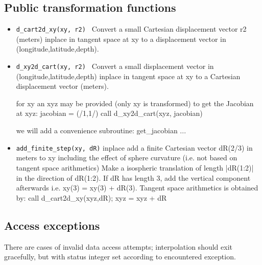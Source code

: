 


\subsection{Public transformation functions}

\begin{itemize}

    \item {\tt d\_cart2d\_xy(xy, r2) } Convert a small Cartesian displacement vector r2 (meters)
           inplace in tangent space at xy to a displacement vector in (longitude,latitude,depth).

    \item {\tt d\_xy2d\_cart(xy, r2) } Convert a small displacement vector in (longitude,latitude,depth)
           inplace in tangent space at xy to a Cartesian displacement vector (meters).


      
for xy an xyz may be provided (only xy is transformed)
to get the Jacobian at xyz: \newline
jacobian = (/1,1/) \newline
call d\_xy2d\_cart(xyz, jacobian)\newline

we will add a convenience subroutine: get\_jacobian ...

    \item {\tt add\_finite\_step(xy, dR)} inplace add a finite
           Cartesian vector dR(2/3) in meters to xy including the 
           effect of sphere curvature (i.e. not based on tangent space arithmetics)
           Make a isospheric translation of length |dR(1:2)| in the direction
           of dR(1:2). If dR has length 3, add the vertical component afterwards
           i.e. xy(3) = xy(3) + dR(3). 
           Tangent space arithmetics is obtained by: \newline
           call d\_cart2d\_xy(xyz,dR);\newline
           xyz = xyz + dR   \newline


\end{itemize}

\subsection{Access exceptions}

There are cases of invalid data access attempts; interpolation should exit gracefully, but
with status integer set according to encountered exception. 

